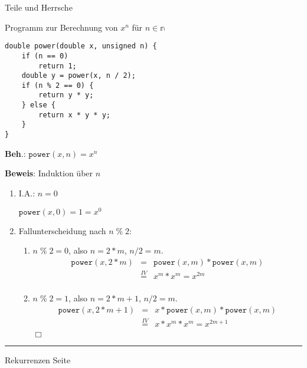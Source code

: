 \begin{slide}{}
\normalsize

\begin{center}
Teile und Herrsche
\end{center}
\vspace*{0.5cm}

\footnotesize
Programm zur Berechnung von $x^n$ f\"ur $n \in \mathbb{n}$
\begin{verbatim}
double power(double x, unsigned n) {
    if (n == 0)
        return 1;
    double y = power(x, n / 2);
    if (n % 2 == 0) {
        return y * y;
    } else {
        return x * y * y;
    }
}
\end{verbatim}
\textbf{Beh}.: \quad $\texttt{power}(x, n) = x^n$

\textbf{Beweis}: Induktion \"uber $n$
\begin{enumerate}
\item I.A.: $n = 0$ 

      $\mathtt{power}(x, 0) = 1 = x^0$
\item Fallunterscheidung nach $n \;\%\; 2$:
  \begin{enumerate}
  \item $n \;\%\; 2 = 0$, also $n = 2 * m$, $n/2 = m$.
        $$
        \begin{array}{lcl}
        \mathtt{power}(x,2*m) & =                & \mathtt{power}(x,m) * \mathtt{power}(x,m) \\
                              & \stackrel{IV}{=} & x^m * x^m = x^{2m} \\
        \end{array}
        $$
  \item $n \;\%\; 2 = 1$, also $n = 2 * m + 1$, $n/2 = m$.
        $$
        \begin{array}{lcl}
        \mathtt{power}(x,2*m+1) & =                & x * \mathtt{power}(x,m) * \mathtt{power}(x,m) \\
                                & \stackrel{IV}{=} & x* x^m * x^m = x^{2m+1} \\
        \end{array}
        $$\hspace*{\fill} $\Box$
  \end{enumerate}
\end{enumerate}


\vspace*{\fill}
\tiny \addtocounter{mypage}{1}
\rule{17cm}{1mm}
Rekurrenzen  \hspace*{\fill} Seite 
\end{slide}

